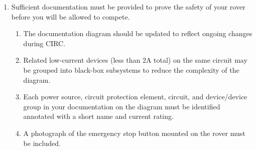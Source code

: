 \begin{enumerate}
    \item Sufficient documentation must be provided to prove the safety of your rover before you will be allowed to compete.
    \begin{enumerate}
        \item The documentation diagram should be updated to reflect ongoing changes during CIRC. \label{req7.5}
        \item Related low-current devices (less than 2A total) on the same circuit may be grouped into black-box subsystems to reduce the complexity of the diagram.
        \item Each power source, circuit protection element, circuit, and device/device group in your documentation on the diagram must be identified annotated with a short name and current rating.
        \item A photograph of the emergency stop button mounted on the rover must be included.
    \end{enumerate}


    \end{enumerate}


